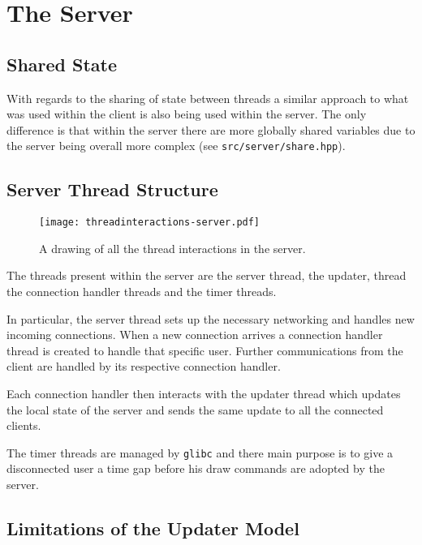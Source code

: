 \documentclass[article]{uom-coursework}
\begin{document}
\section{The Server}

\subsection{Shared State}

With regards to the sharing of state between threads a similar
approach to what was used within the client is also being used
within the server. The only difference is that within the server
there are more globally shared variables due to the server being
overall more complex (see \texttt{src/server/share.hpp}).

\subsection{Server Thread Structure}

\begin{figure}[H]
\centering
\begin{mdframed}[backgroundcolor=OffWhite]
\texttt{[image: threadinteractions-server.pdf]}
\end{mdframed}
\caption{A drawing of all the thread interactions in the
server.}
\label{fig:serverthreads}
\end{figure}

The threads present within the server are the server thread, the
updater, thread the connection handler threads and the timer
threads.

In particular, the server thread sets up the necessary
networking and handles new incoming connections. When a new
connection arrives a connection handler thread is created to
handle that specific user. Further communications from the
client are handled by its respective connection handler.

Each connection handler then interacts with the updater thread
which updates the local state of the server and sends the same
update to all the connected clients.

The timer threads are managed by \texttt{glibc} and there main
purpose is to give a disconnected user a time gap before his
draw commands are adopted by the server.

\subsection{Limitations of the Updater Model}\label{subsec:updatermodel}
\end{document}
